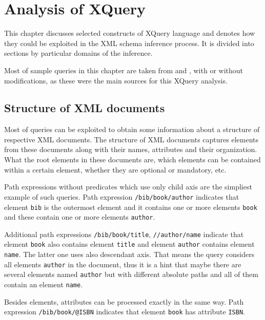 \chapter{Analysis of XQuery} \label{CHAPTER_analysis_of_xquery}
This chapter discusses selected constructs of XQuery language and denotes how they could be exploited in the XML schema inference process. It is divided into sections by particular domains of the inference.

Most of sample queries in this chapter are taken from \cite{Walmsley:2007:XQU:1205865} and \cite{Marchiori:07:XQU}, with or without modifications, as these were the main sources for this XQuery analysis.

\section{Structure of XML documents}
Most of queries can be exploited to obtain some information about a structure of respective XML documents. The structure of XML documents captures elements from these documents along with their names, attributes and their organization. What the root elements in these documents are, which elements can be contained within a certain element, whether they are optional or mandatory, etc.

Path expressions without predicates which use only child axis are the simpliest example of such queries. Path expression \texttt{/bib/book/author} indicates that element \texttt{bib} is the outermost element and it contains one or more elements \texttt{book} and these contain one or more elements \texttt{author}.

Additional path expressions \texttt{/bib/book/title}, \texttt{//author/name} indicate that element \texttt{book} also contains element \texttt{title} and element \texttt{author} contains element \texttt{name}. The latter one uses also descendant axis. That means the query considers all elements \texttt{author} in the document, thus it is a hint that maybe there are several elements named \texttt{author} but with different absolute paths and all of them contain an element \texttt{name}.

Besides elements, attributes can be processed exactly in the same way. Path expression \texttt{/bib/book/@ISBN} indicates that element \texttt{book} has attribute \texttt{ISBN}.

